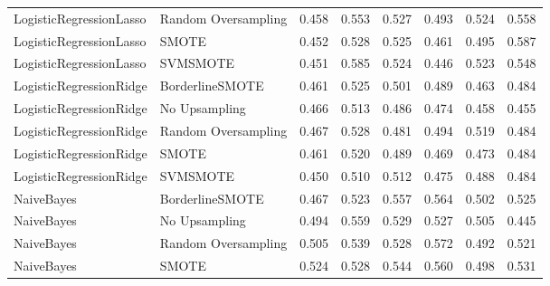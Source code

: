 \begin{tabular}{llllllll}
     LogisticRegressionLasso & Random Oversampling & 0.458 &                     0.553 &                 0.527 &                  0.493 &                                   0.524 &     0.558 \\
     LogisticRegressionLasso &               SMOTE & 0.452 &                     0.528 &                 0.525 &                  0.461 &                                   0.495 &     0.587 \\
     LogisticRegressionLasso &            SVMSMOTE & 0.451 &                     0.585 &                 0.524 &                  0.446 &                                   0.523 &     0.548 \\
     LogisticRegressionRidge &     BorderlineSMOTE & 0.461 &                     0.525 &                 0.501 &                  0.489 &                                   0.463 &     0.484 \\
     LogisticRegressionRidge &       No Upsampling & 0.466 &                     0.513 &                 0.486 &                  0.474 &                                   0.458 &     0.455 \\
     LogisticRegressionRidge & Random Oversampling & 0.467 &                     0.528 &                 0.481 &                  0.494 &                                   0.519 &     0.484 \\
     LogisticRegressionRidge &               SMOTE & 0.461 &                     0.520 &                 0.489 &                  0.469 &                                   0.473 &     0.484 \\
     LogisticRegressionRidge &            SVMSMOTE & 0.450 &                     0.510 &                 0.512 &                  0.475 &                                   0.488 &     0.484 \\
                  NaiveBayes &     BorderlineSMOTE & 0.467 &                     0.523 &                 0.557 &                  0.564 &                                   0.502 &     0.525 \\
                  NaiveBayes &       No Upsampling & 0.494 &                     0.559 &                 0.529 &                  0.527 &                                   0.505 &     0.445 \\
                  NaiveBayes & Random Oversampling & 0.505 &                     0.539 &                 0.528 &                  0.572 &                                   0.492 &     0.521 \\
                  NaiveBayes &               SMOTE & 0.524 &                     0.528 &                 0.544 &                  0.560 &                                   0.498 &     0.531 \\

\end{tabular}
